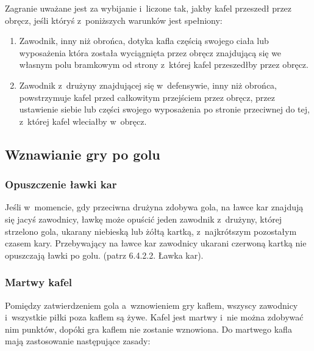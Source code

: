 \documentclass[12pt,a4paper]{article}
\begin{document}
Zagranie uważane jest za wybijanie i~liczone tak, jakby kafel przeszedł
przez obręcz, jeśli któryś z~poniższych warunków jest spełniony:

\begin{enumerate}
	\item
	      Zawodnik, inny niż obrońca, dotyka kafla częścią swojego ciała lub
	      wyposażenia która została wyciągnięta przez obręcz znajdującą się we
	      własnym polu bramkowym od strony z~której kafel przeszedłby przez
	      obręcz.
	\item
	      Zawodnik z~drużyny znajdującej się w~defensywie, inny niż obrońca,
	      powstrzymuje kafel przed całkowitym przejściem przez obręcz, przez
	      ustawienie siebie lub części swojego wyposażenia po stronie przeciwnej
	      do tej, z~której kafel wleciałby w~obręcz.
\end{enumerate}

\subsection{Wznawianie gry po golu}

\subsubsection{Opuszczenie ławki kar}
Jeśli w~momencie, gdy przeciwna
drużyna zdobywa gola, na ławce kar znajdują się jacyś zawodnicy, ławkę
może opuścić jeden zawodnik z~drużyny, której strzelono gola, ukarany
niebieską lub żółtą kartką, z~najkrótszym pozostałym czasem kary.
Przebywający na ławce kar zawodnicy ukarani czerwoną kartką nie
opuszczają ławki po golu. (patrz 6.4.2.2. Ławka kar).

\subsubsection{Martwy kafel}
Pomiędzy zatwierdzeniem gola a~wznowieniem
gry kaflem, wszyscy zawodnicy i~wszystkie piłki poza kaflem są żywe.
Kafel jest martwy i~nie można zdobywać nim punktów, dopóki gra
kaflem nie zostanie wznowiona. Do martwego kafla mają zastosowanie
następujące zasady:
\end{document}
